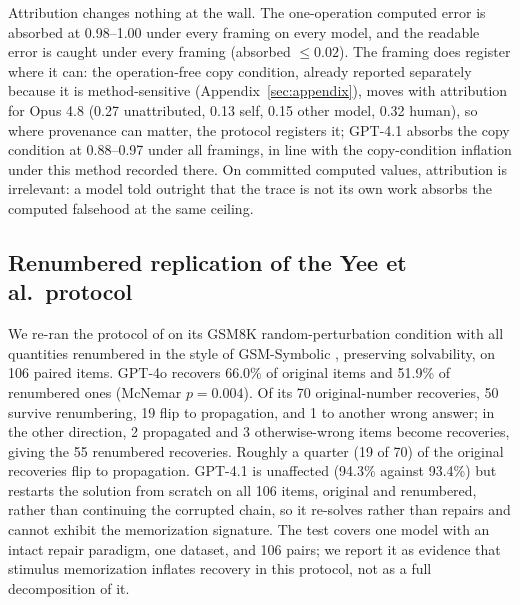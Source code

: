 Attribution changes nothing at the wall. The one-operation computed error is absorbed at 0.98--1.00 under every framing on every model, and the readable error is caught under every framing (absorbed $\leq 0.02$). The framing does register where it can: the operation-free copy condition, already reported separately because it is method-sensitive (Appendix~\ref{sec:appendix}), moves with attribution for Opus 4.8 (0.27 unattributed, 0.13 self, 0.15 other model, 0.32 human), so where provenance can matter, the protocol registers it; GPT-4.1 absorbs the copy condition at 0.88--0.97 under all framings, in line with the copy-condition inflation under this method recorded there. On committed computed values, attribution is irrelevant: a model told outright that the trace is not its own work absorbs the computed falsehood at the same ceiling.

\subsection{Renumbered replication of the Yee et al.\ protocol}
\label{app:renumber}

We re-ran the protocol of \citet{yee2024faithful} on its GSM8K random-perturbation condition with all quantities renumbered in the style of GSM-Symbolic \citep{mirzadeh2025gsmsymbolic}, preserving solvability, on 106 paired items. GPT-4o recovers 66.0\% of original items and 51.9\% of renumbered ones (McNemar $p=0.004$). Of its 70 original-number recoveries, 50 survive renumbering, 19 flip to propagation, and 1 to another wrong answer; in the other direction, 2 propagated and 3 otherwise-wrong items become recoveries, giving the 55 renumbered recoveries. Roughly a quarter (19 of 70) of the original recoveries flip to propagation. GPT-4.1 is unaffected (94.3\% against 93.4\%) but restarts the solution from scratch on all 106 items, original and renumbered, rather than continuing the corrupted chain, so it re-solves rather than repairs and cannot exhibit the memorization signature. The test covers one model with an intact repair paradigm, one dataset, and 106 pairs; we report it as evidence that stimulus memorization inflates recovery in this protocol, not as a full decomposition of it.

